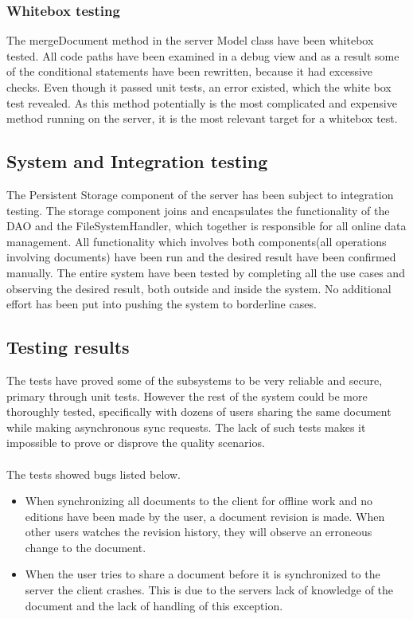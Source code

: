 \documentclass[a4paper,11pt,report]{report}
\begin{document}
\subsubsection{Whitebox testing}
The mergeDocument method in the server Model class have been whitebox tested. All code paths have been examined in a debug view and as a result some of the conditional statements have been rewritten, because it had excessive checks. Even though it passed unit tests, an error existed, which the white box test revealed. As this method potentially is the most complicated and expensive method running on the server, it is the most relevant target for a whitebox test.
\subsection{System and Integration testing}
The Persistent Storage component of the server has been subject to integration testing. The storage component joins and encapsulates the functionality of the DAO and the FileSystemHandler, which together is responsible for all online data management. All functionality which involves both components(all operations involving documents) have been run and the desired result have been confirmed manually. The entire system have been tested by completing all the use cases and observing the desired result, both outside and inside the system. No additional effort has been put into pushing the system to borderline cases.
\subsection{Testing results}
The tests have proved some of the subsystems to be very reliable and secure, primary through unit tests. However the rest of the system could be more thoroughly tested, specifically with dozens of users sharing the same document while making asynchronous sync requests. The lack of such tests makes it impossible to prove or disprove the quality scenarios. \\ \\
The tests showed bugs listed below.
\begin{itemize}
\item When synchronizing all documents to the client for offline work and no editions have been made by the user, a document revision is made. When other users watches the revision history, they will observe an erroneous change to the document.
\item When the user tries to share a document before it is synchronized to the server the client crashes. This is due to the servers lack of knowledge of the document and the lack of handling of this exception.
\end{itemize}
\end{document}
